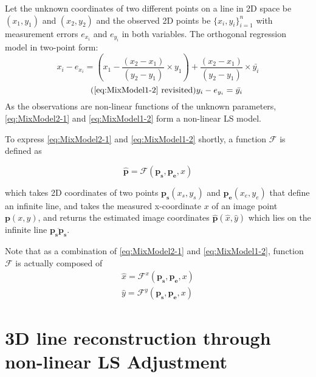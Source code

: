 Let the unknown coordinates of two different points on a line in 2D space be $(x_1,y_1)$ and $(x_2,y_2)$ and the observed 2D points be $\{x_i,y_i\}^n_{i=1}$ with measurement errors $e_{x_i}$ and $e_{y_i}$ in both variables. The orthogonal regression model in two-point form: 
\begin{equation} \label{eq:MixModel2-1}
x_i - e_{x_i}= (x_1-\dfrac{(x_2-x_1)}{(y_2-y_1)}\times y_1) + \dfrac{(x_2-x_1)}{(y_2-y_1)}\times \bar{y_i}
\end{equation}
\begin{equation} \tag{\ref{eq:MixModel1-2} revisited}
y_i-e_{y_i} = \bar{y_i}
\end{equation}
As the observations are non-linear functions of the unknown parameters, \cref{eq:MixModel2-1} and \cref{eq:MixModel1-2} form a non-linear LS model. %

To express \eqref{eq:MixModel2-1} and \eqref{eq:MixModel1-2} shortly, a function $\mathcal{F}$ is defined as

\begin{equation} \label{eq:Ffunction}
\mathbf{\hat{p}} = \mathcal{F}(\mathbf{p_s},\mathbf{p_e},x)
\end{equation}

which takes 2D coordinates of two points $\mathbf{p_s}(x_s,y_s)$ and $\mathbf{p_e}(x_e,y_e)$ that define an infinite line, and takes the measured x-coordinate $x$ of an image point $\mathbf{p}(x,y)$, and returns the estimated image coordinates $\mathbf{\hat{p}}(\hat{x},\hat{y})$ which lies on the infinite line $\overline{\mathbf{p_s}\mathbf{p_s}}$.

Note that as a combination of \eqref{eq:MixModel2-1} and \eqref{eq:MixModel1-2}, function $\mathcal{F}$ is actually composed of
\begin{equation} \label{eq:Ffunction_xy}
\begin{split}
\hat{x} = \mathcal{F}^x(\mathbf{p_s},\mathbf{p_e},x)\\
\hat{y} = \mathcal{F}^y(\mathbf{p_s},\mathbf{p_e},x)
\end{split}
\end{equation}


\section{3D line reconstruction through non-linear LS Adjustment}
\label{sec:LSadj}

